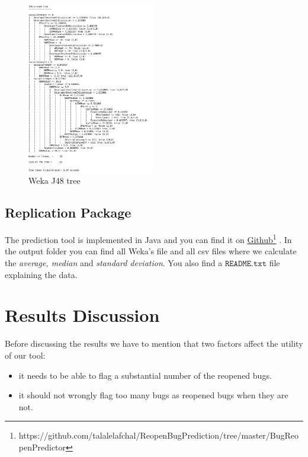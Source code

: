 \documentclass[sigconf,review]{acmart}
\begin{document}
\begin{figure}
  \centering
  \includegraphics[width=0.5\textwidth]{j48.png}
  \caption{Weka J48 tree}\label{fig:j48}
\end{figure}




\subsection{Replication Package}
The prediction tool is implemented in Java and you can find it on  \href{https://github.com/talalelafchal/ReopenBugPrediction/tree/master/BugReopenPredictor}{Github}\footnote{https://github.com/talalelafchal/ReopenBugPrediction/tree/master/BugReopenPredictor} . In the output folder you can find all Weka's file and all csv files where we calculate the \emph{average, median} and \emph{standard deviation}. You also find a $\mathtt{README.txt}$ file explaining the data.

\section{Results Discussion}
  Before discussing the results we have to mention that two factors affect the utility of our tool: 
  
  \begin{itemize}
  \item it needs to be able to flag a substantial number of the reopened bugs.
  \item  it should not wrongly flag too many bugs as reopened bugs when they are not.
  \end{itemize}
\end{document}
